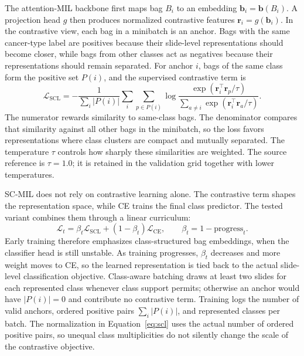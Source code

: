 \documentclass[11pt]{article}
\begin{document}
The attention-MIL backbone first maps bag $B_i$ to an embedding $\mathbf{b}_i=\mathbf{b}(B_i)$. A projection head $g$ then produces normalized contrastive features $\mathbf{r}_i=g(\mathbf{b}_i)$. In the contrastive view, each bag in a minibatch is an anchor. Bags with the same cancer-type label are positives because their slide-level representations should become closer, while bags from other classes act as negatives because their representations should remain separated. For anchor $i$, bags of the same class form the positive set $P(i)$, and the supervised contrastive term is
\begin{equation}
  \mathcal{L}_{\mathrm{SCL}} =
  -\frac{1}{\sum_i |P(i)|}
  \sum_i \sum_{p\in P(i)}
  \log
  \frac{\exp(\mathbf{r}_i^\top\mathbf{r}_p/\tau)}
       {\sum_{a\ne i}\exp(\mathbf{r}_i^\top\mathbf{r}_a/\tau)}.
  \label{eq:scl}
\end{equation}
\noindent The numerator rewards similarity to same-class bags. The denominator compares that similarity against all other bags in the minibatch, so the loss favors representations where class clusters are compact and mutually separated. The temperature $\tau$ controls how sharply these similarities are weighted. The source reference is $\tau=\num{1.0}$; it is retained in the validation grid together with lower temperatures.

SC-MIL does not rely on contrastive learning alone. The contrastive term shapes the representation space, while CE trains the final class predictor. The tested variant combines them through a linear curriculum:
\begin{equation}
  \mathcal{L}_t =
  \beta_t\mathcal{L}_{\mathrm{SCL}} +
  (1-\beta_t)\mathcal{L}_{\mathrm{CE}},
  \qquad
  \beta_t = 1-\mathrm{progress}_t.
  \label{eq:scmil}
\end{equation}
\noindent Early training therefore emphasizes class-structured bag embeddings, when the classifier head is still unstable. As training progresses, $\beta_t$ decreases and more weight moves to CE, so the learned representation is tied back to the actual slide-level classification objective. Class-aware batching draws at least two slides for each represented class whenever class support permits; otherwise an anchor would have $|P(i)|=0$ and contribute no contrastive term. Training logs the number of valid anchors, ordered positive pairs $\sum_i|P(i)|$, and represented classes per batch. The normalization in Equation~\eqref{eq:scl} uses the actual number of ordered positive pairs, so unequal class multiplicities do not silently change the scale of the contrastive objective.
\end{document}
